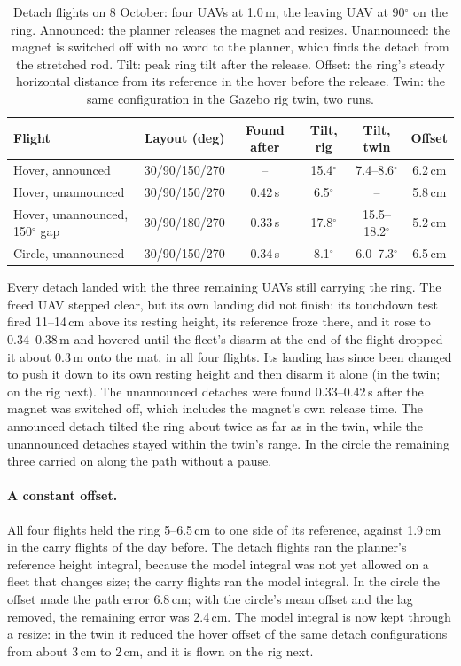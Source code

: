 \begin{table}[h]
\centering
\small
\caption{Detach flights on 8 October: four UAVs at 1.0\,m, the leaving UAV at 90$^\circ$ on the
ring. Announced: the planner releases the magnet and resizes. Unannounced: the magnet is switched off
with no word to the planner, which finds the detach from the stretched rod. Tilt: peak ring tilt after
the release. Offset: the ring's steady horizontal distance from its reference in the hover before the
release. Twin: the same configuration in the Gazebo rig twin, two runs.}
\label{tab:rig_oct8}
\begin{tabularx}{\textwidth}{>{\raggedright\arraybackslash}Xccccc}
\toprule
Flight & Layout (deg) & Found after & Tilt, rig & Tilt, twin & Offset \\
\midrule
Hover, announced & 30/90/150/270 & -- & 15.4$^\circ$ & 7.4--8.6$^\circ$ & 6.2\,cm \\
Hover, unannounced & 30/90/150/270 & 0.42\,s & 6.5$^\circ$ & -- & 5.8\,cm \\
Hover, unannounced, 150$^\circ$ gap & 30/90/180/270 & 0.33\,s & 17.8$^\circ$ & 15.5--18.2$^\circ$ & 5.2\,cm \\
Circle, unannounced & 30/90/150/270 & 0.34\,s & 8.1$^\circ$ & 6.0--7.3$^\circ$ & 6.5\,cm \\
\bottomrule
\end{tabularx}
\end{table}

Every detach landed with the three remaining UAVs still carrying the ring. The freed UAV stepped clear,
but its own landing did not finish: its touchdown test fired 11--14\,cm above its resting height, its
reference froze there, and it rose to 0.34--0.38\,m and hovered until the fleet's disarm at the end of
the flight dropped it about 0.3\,m onto the mat, in all four flights. Its landing has since been changed to
push it down to its own resting height and then disarm it alone (in the twin; on the rig next). The
unannounced detaches were found 0.33--0.42\,s after the magnet was switched
off, which includes the magnet's own release time. The announced detach tilted the ring about twice
as far as in the twin, while the unannounced detaches stayed within the twin's range. In the circle the
remaining three carried on along the path without a pause.

\paragraph{A constant offset.} All four flights held the ring 5--6.5\,cm to one side of its
reference, against 1.9\,cm in the carry flights of the day before. The detach flights ran the
planner's reference height integral, because the model integral was not yet allowed on a fleet that
changes size; the carry flights ran the model integral. In the circle the offset made the path error
6.8\,cm; with the circle's mean offset and the lag removed, the remaining error was 2.4\,cm. The
model integral is now kept through a resize: in the twin it reduced the hover offset of the same
detach configurations from about 3\,cm to 2\,cm, and it is flown on the rig next.
